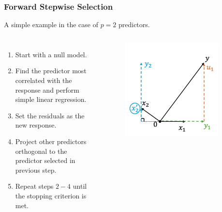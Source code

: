 \begin{frame}
\frametitle{Forward Stepwise Selection}
A simple example in the case of $p=2$ predictors.

\begin{columns}[t]
    \begin{enumerate}
        \item Start with a null model.
        \item Find the predictor most correlated with the response and perform simple linear regression.
        \item Set the residuals as the new response.
        \item Project other predictors orthogonal to the predictor selected in previous step.
        \item Repeat steps $2-4$ until the stopping criterion is met.
    \end{enumerate}
    
    \begin{figure}[!htbp]
        \begin{center}
            \includegraphics[width=0.9\textwidth]{img/FStepR/5.jpeg}
        \end{center}
    \end{figure}
    \end{columns}
\end{frame}

